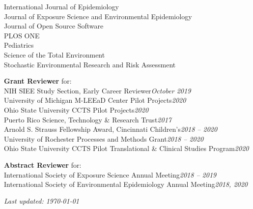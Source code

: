 \documentclass[margin,line]{res}
\newenvironment{list3}{
  \begin{list}{}{%
      \setlength{\itemsep}{0in}
      \setlength{\parsep}{0in} \setlength{\parskip}{0in}
      \setlength{\topsep}{0in} \setlength{\partopsep}{0in}
      \setlength{\leftmargin}{0in}}}{\end{list}}
\begin{document}
\begin{resume}
\begin{list3}
        International Journal of Epidemiology \\
        Journal of Exposure Science and Environmental Epidemiology \\
        Journal of Open Source Software \\
        PLOS ONE \\
        Pediatrics \\
        Science of the Total Environment \\
        Stochastic Environmental Research and Risk Assessment
\item[] \textbf{Grant Reviewer} for: \\
        NIH SIEE Study Section, Early Career Reviewer\hfill \textit{October 2019}\\
        University of Michigan M-LEEaD Center Pilot Projects\hfill \textit{2020}\\
        Ohio State University CCTS Pilot Projects\hfill \textit{2020}\\
        Puerto Rico Science, Technology \& Research Trust\hfill \textit{2017}\\
        Arnold S. Strauss Fellowship Award, Cincinnati Children's\hfill \textit{2018 -- 2020}\\
        University of Rochester Processes and Methods Grant\hfill \textit{2018
          -- 2020}\\
        Ohio State University CCTS Pilot Translational \& Clinical Studies
        Program\hfill \textit{2020}
\item[] \textbf{Abstract Reviewer} for: \\
        International Society of Exposure Science Annual Meeting\hfill \textit{2018 -- 2019}\\
        International Society of Environmental Epidemiology Annual Meeting\hfill \textit{2018, 2020}
\end{list3}

\end{resume}

\vfill

\hfill \textit{Last updated: \today}
\end{document}
